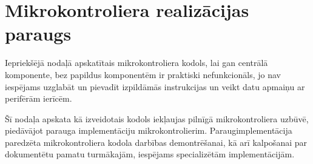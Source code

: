 \section{Mikrokontroliera realizācijas paraugs}
	Iepriekšējā nodaļā apskatītais mikrokontroliera kodols, lai gan centrālā
	komponente, bez papildus komponentēm ir praktiski nefunkcionāls, jo
	nav iespējams uzglabāt un pievadīt izpildāmās instrukcijas un veikt
	datu apmaiņu ar perifērām ierīcēm.
	
	
	Šī nodaļa apskata kā izveidotais kodols iekļaujas
	pilnīgā mikrokontroliera uzbūvē, piedāvājot	parauga implementāciju
	mikrokontrolierim. 
	Paraug\-implementācija paredzēta mikrokontroliera kodola 
	darbības demontrēšanai, kā arī kalpošanai par dokumentētu pamatu 
	turmākajām, iespējams specializētām implementācijām.
	
	
	 \pagebreak[3]
	
